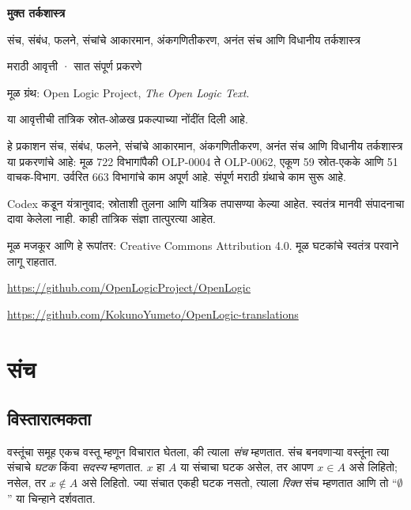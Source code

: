 \documentclass[11pt,a4paper,openany]{book}
\theoremstyle{definition}
\begin{document}
\begin{titlepage}
\vspace*{2cm}
{\Huge\bfseries मुक्त तर्कशास्त्र\par}
\vspace{1cm}
{\LARGE संच, संबंध, फलने, संचांचे आकारमान, अंकगणितीकरण, अनंत संच आणि विधानीय तर्कशास्त्र\par}
\vspace{1cm}
{\large मराठी आवृत्ती · सात संपूर्ण प्रकरणे\par}
\vfill
मूळ ग्रंथ: Open Logic Project, \textit{The Open Logic Text}.\par
या आवृत्तीची तांत्रिक स्रोत-ओळख प्रकल्पाच्या नोंदींत दिली आहे.\par
हे प्रकाशन संच, संबंध, फलने, संचांचे आकारमान, अंकगणितीकरण, अनंत संच आणि विधानीय तर्कशास्त्र या प्रकरणांचे आहे: मूळ 722 विभागांपैकी OLP-0004 ते OLP-0062, एकूण 59 स्रोत-एकके आणि 51 वाचक-विभाग. उर्वरित 663 विभागांचे काम अपूर्ण आहे.
संपूर्ण मराठी ग्रंथाचे काम सुरू आहे.\par
Codex कडून यंत्रानुवाद; स्रोताशी तुलना आणि यांत्रिक तपासण्या केल्या आहेत.
स्वतंत्र मानवी संपादनाचा दावा केलेला नाही. काही तांत्रिक संज्ञा तात्पुरत्या आहेत.\par
मूळ मजकूर आणि हे रूपांतर: Creative Commons Attribution 4.0.
मूळ घटकांचे स्वतंत्र परवाने लागू राहतात.\par
\url{https://github.com/OpenLogicProject/OpenLogic}\par
\url{https://github.com/KokunoYumeto/OpenLogic-translations}
\end{titlepage}
\tableofcontents
\chapter{संच}








\section{विस्तारात्मकता}\label{sfr:set:bas:sec}

वस्तूंचा समूह एकच वस्तू {म्हणून} विचारात घेतला, की त्याला \emph{संच} म्हणतात.
संच बनवणाऱ्या वस्तूंना त्या संचाचे \emph{घटक} किंवा \emph{सदस्य} म्हणतात.
$x$ हा $A$ या संचाचा घटक असेल, तर आपण $x \in A$ असे लिहितो;
नसेल, तर $x \notin A$ असे लिहितो. ज्या संचात एकही घटक नसतो,
त्याला \emph{रिक्त} संच म्हणतात आणि तो ``$\emptyset$'' या चिन्हाने दर्शवतात.
\end{document}

